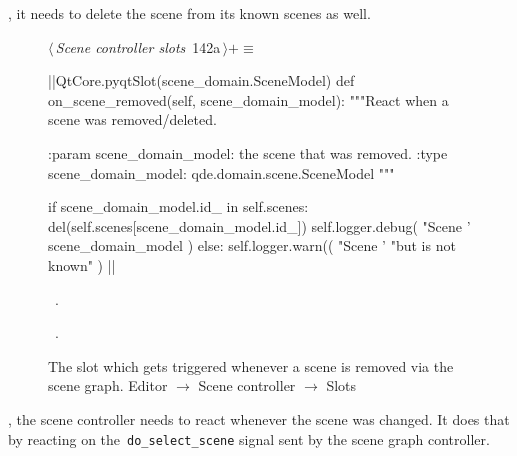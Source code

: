 \documentclass[%
    a4paper,    %
    justified,  %
    nobib,      %
    openany     %
]{tufte-book}
\makeatletter
\renewcommand{\label}[1]{\@tufte@label{##1}}%
\makeatother
\begin{document}
, it needs to delete the scene from its
known scenes as well.

\begin{figure}[!htbp]
\begin{flushleft} \small
\begin{minipage}{\linewidth}\label{scrap93}\raggedright\small
{} $\langle\,${\itshape Scene controller slots}\nobreak\ {\footnotesize {142a}}$\,\rangle+\equiv$
\vspace{-1ex}
\begin{pythoncode}
|\normalfont{}\fontfamily{}|QtCore.pyqtSlot(scene_domain.SceneModel)
def on_scene_removed(self, scene_domain_model):
    """React when a scene was removed/deleted.

    :param scene_domain_model: the scene that was removed.
    :type scene_domain_model:  qde.domain.scene.SceneModel
    """

    if scene_domain_model.id_ in self.scenes:
        del(self.scenes[scene_domain_model.id_])
        self.logger.debug(
            "Scene '%
            scene_domain_model
        )
    else:
        self.logger.warn((
            "Scene '%
            "but is not known"
        ) %
|\NWsep|
\end{pythoncode}
\vspace{1.5ex}
\footnotesize
\begin{list}{}{\setlength{\itemsep}{-\parsep}\setlength{\itemindent}{-\leftmargin}}
\item \NWtxtMacroDefBy\ .
\item \NWtxtMacroRefIn\ .

\item{}
\end{list}
\end{minipage}\vspace{4ex}
\end{flushleft}
\caption{The slot which gets triggered whenever a scene is removed via the
  scene graph.
  \newline{}\newline{}Editor $\rightarrow$ Scene controller $\rightarrow$
  Slots}
\end{figure}

, the scene controller needs to react
whenever the scene was changed. It does that by reacting on
the~\verb=do_select_scene= signal sent by the scene graph controller.
\end{document}
